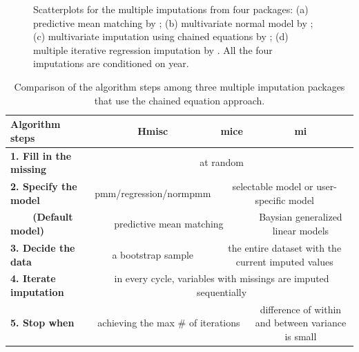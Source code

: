 \documentclass[article]{jss}
\begin{document}
\begin{center}
\begin{figure}[!h]
\begin{centering}
\begin{tabular}{cccc}
\end{tabular}
\par\end{centering}
\caption{Scatterplots for the multiple imputations from four
 packages: (a) predictive mean matching by ;
(b) multivariate normal model by ; (c) multivariate
imputation using chained equations by ; (d) multiple
iterative regression imputation by . All the four
imputations are conditioned on year.}
\label{fig:multiple-imputation}
\end{figure}
\par\end{center}

\begin{center}
\begin{table}[!h]
\begin{centering}
\begin{tabular}{l|c|c|c}
\hline 
\textbf{\scriptsize{Algorithm steps}} & \textbf{\scriptsize{Hmisc}} & \textbf{\scriptsize{mice}} & \textbf{\scriptsize{mi}}\tabularnewline
\hline 
\textbf{\scriptsize{1. Fill in the missing}} & \multicolumn{3}{c}{{\scriptsize{at random}}}\tabularnewline
\hline 
\textbf{\scriptsize{2. Specify the model}} & {\scriptsize{pmm/regression/normpmm}} & \multicolumn{2}{c}{{\scriptsize{selectable model or user-specific model}}}\tabularnewline
\hline 
\textbf{\scriptsize{~~~~(Default model)}} & \multicolumn{2}{c|}{{\scriptsize{predictive mean matching}}} & {\scriptsize{Baysian generalized linear models}}\tabularnewline
\hline 
\textbf{\scriptsize{3. Decide the data}} & {\scriptsize{a bootstrap sample}} & \multicolumn{2}{c}{{\scriptsize{the entire dataset with the current imputed values}}}\tabularnewline
\hline 
\textbf{\scriptsize{4. Iterate imputation}} & \multicolumn{3}{c}{{\scriptsize{in every cycle, variables with missings are imputed sequentially}}}\tabularnewline
\hline 
\textbf{\scriptsize{5. Stop when}} & \multicolumn{2}{c|}{{\scriptsize{achieving the max \# of iterations}}} & {\scriptsize{difference of within and between variance is small}}\tabularnewline
\hline 
\end{tabular}
\par\end{centering}
\caption{Comparison of the algorithm steps among three multiple
imputation packages that use the chained equation approach.}
\label{tab:compare-mi}
\end{table}
\par\end{center}
\end{document}
